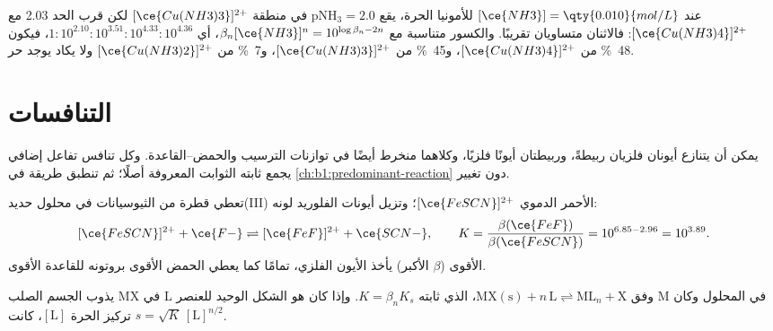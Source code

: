 \begin{example}\label{ex:b1:complexation:cu}
عند $[\ce{NH3}] = \qty{0.010}{mol/L}$ للأمونيا الحرة، يقع $\mathrm{pNH_3} = 2.0$ في
منطقة $[\ce{Cu(NH3)3}]^{2+}$ لكن قرب الحد 2.03 مع
$[\ce{Cu(NH3)4}]^{2+}$: فالاثنان متساويان تقريبًا. والكسور
متناسبة مع $\beta_n[\ce{NH3}]^n = 10^{\log\beta_n - 2n}$، أي
$1 : 10^{2.10} : 10^{3.51} : 10^{4.33} : 10^{4.36}$، فيكون \qty{48}{\percent} من
$[\ce{Cu(NH3)4}]^{2+}$، و\qty{45}{\percent} من $[\ce{Cu(NH3)3}]^{2+}$،
و\qty{7}{\percent} من $[\ce{Cu(NH3)2}]^{2+}$ ولا يكاد يوجد  حر.
\end{example}

\section{التنافسات}

يمكن أن يتنازع أيونان فلزيان ربيطةً، وربيطتان أيونًا فلزيًا،
وكلاهما منخرط أيضًا في توازنات الترسيب والحمض--القاعدة.
وكل تنافس تفاعل إضافي يجمع ثابته
الثوابت المعروفة أصلًا؛ ثم تنطبق طريقة  في
\cref{ch:b1:predominant-reaction} دون تغيير.

\begin{example}\label{ex:b1:complexation:scn-f}
تعطي قطرة من الثيوسيانات في محلول حديد(III)  الأحمر الدموي
$[\ce{FeSCN}]^{2+}$؛ وتزيل أيونات الفلوريد لونه:
\[
  [\ce{FeSCN}]^{2+} + \ce{F-} \rightleftharpoons [\ce{FeF}]^{2+} + \ce{SCN-},
  \qquad K = \frac{\beta(\ce{FeF})}{\beta(\ce{FeSCN})} = 10^{6.85 - 2.96} =
  10^{3.89} .
\]
 الأقوى ($\beta$ الأكبر) يأخذ الأيون الفلزي، تمامًا كما يعطي
الحمض الأقوى بروتونه للقاعدة الأقوى.
\end{example}

\begin{proposition}\label{prop:b1:complexation:competition-precipitation}
يذوب الجسم الصلب MX في  L وفق
$\mathrm{MX(s)} + n\,\mathrm{L} \rightleftharpoons \mathrm{ML}_n + \mathrm{X}$،
الذي ثابته $K = \beta_n K_s$. وإذا كان  هو الشكل الوحيد للعنصر M في
المحلول وكان تركيز  الحرة $[\mathrm{L}]$، كانت
 $s = \sqrt{K}\,[\mathrm{L}]^{n/2}$.
\end{proposition}

